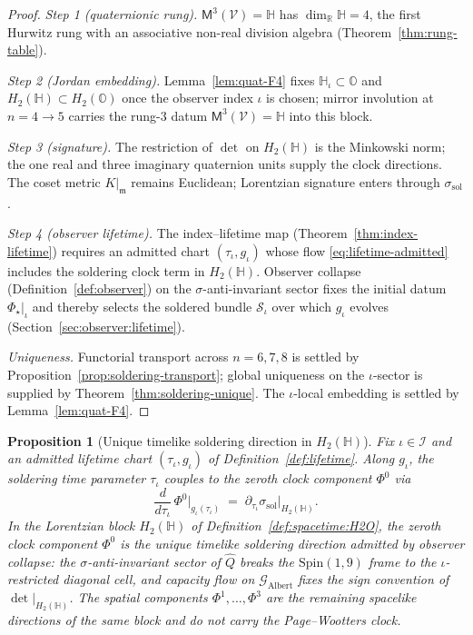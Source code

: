 \documentclass[aps,prd,onecolumn,amsmath,amssymb,nofootinbib,11pt]{revtex4-2}
\numberwithin{equation}{section}
\theoremstyle{plain}
\newtheorem{proposition}[theorem]{Proposition}
\theoremstyle{definition}
\theoremstyle{remark}
\newcommand{\R}{\mathbb{R}}
\newcommand{\Quat}{\mathbb{H}}
\newcommand{\Oct}{\mathbb{O}}
\newcommand{\Spin}{\mathrm{Spin}}
\newcommand{\Void}{\mathcal{V}}
\newcommand{\Mirror}{\mathsf{M}}
\newcommand{\orderparam}{\Phi}
\begin{document}
\begin{proof}
\emph{Step 1 (quaternionic rung).} $\Mirror^3(\Void)=\Quat$ has
$\dim_{\R}\Quat=4$, the first Hurwitz rung with an associative non-real
division algebra (Theorem~\ref{thm:rung-table}).

\emph{Step 2 (Jordan embedding).} Lemma~\ref{lem:quat-F4} fixes
$\Quat_\iota\subset\Oct$ and $H_2(\Quat)\subset H_2(\Oct)$ once the
observer index $\iota$ is chosen; mirror involution at $n=4\to5$ carries
the rung-$3$ datum $\Mirror^3(\Void)=\Quat$ into this block.

\emph{Step 3 (signature).} The restriction of $\det$ on $H_2(\Quat)$ is the
Minkowski norm; the one real and three imaginary quaternion units supply the clock
directions. The coset metric $K|_{\mathfrak{m}}$ remains Euclidean;
Lorentzian signature enters through $\sigma_{\mathrm{sol}}$.

\emph{Step 4 (observer lifetime).} The index--lifetime map
(Theorem~\ref{thm:index-lifetime}) requires an admitted chart
$(\tau_\iota,g_\iota)$ whose flow \eqref{eq:lifetime-admitted} includes the
soldering clock term in $H_2(\Quat)$. Observer collapse
(Definition~\ref{def:observer}) on the $\sigma$-anti-invariant sector fixes
the initial datum $\orderparam_\star|_\iota$ and thereby selects the soldered
bundle $\mathcal{S}_\iota$ over which $g_\iota$ evolves
(Section~\ref{sec:observer:lifetime}).

\emph{Uniqueness.} Functorial transport across $n=6,7,8$ is settled by
Proposition~\ref{prop:soldering-transport}; global uniqueness on the
$\iota$-sector is supplied by Theorem~\ref{thm:soldering-unique}. The
$\iota$-local embedding is settled by Lemma~\ref{lem:quat-F4}.
\end{proof}

\begin{proposition}[Unique timelike soldering direction in $H_2(\Quat)$]
\label{prop:soldering-clock}
Fix $\iota\in\mathcal{I}$ and an admitted lifetime chart
$(\tau_\iota,g_\iota)$ of Definition~\ref{def:lifetime}. Along $g_\iota$,
the soldering time parameter $\tau_\iota$ couples to the zeroth clock
component $\orderparam^0$ via
\begin{equation}\label{eq:soldering-clock}
  \frac{d}{d\tau_\iota}\,\orderparam^0\big|_{g_\iota(\tau_\iota)}
  \;=\;
  \partial_{\tau_\iota}\sigma_{\mathrm{sol}}\big|_{H_2(\Quat)}.
\end{equation}
In the Lorentzian block $H_2(\Quat)$ of
Definition~\ref{def:spacetime:H2O}, the zeroth clock component
$\orderparam^0$ is the \emph{unique} timelike soldering direction admitted
by observer collapse: the $\sigma$-anti-invariant sector of $\hat Q$
breaks the $\Spin(1,9)$ frame to the $\iota$-restricted diagonal cell, and
capacity flow on $\mathcal{G}_{\mathrm{Albert}}$ fixes the sign convention
of $\det|_{H_2(\Quat)}$. The spatial components
$\orderparam^1,\ldots,\orderparam^3$ are the remaining spacelike directions
of the same block and do not carry the Page--Wootters clock.
\end{proposition}
\end{document}
